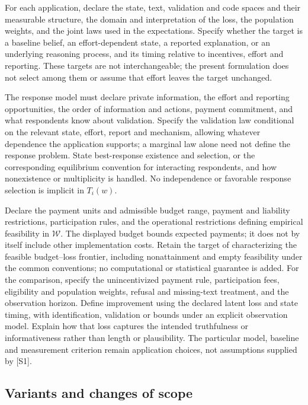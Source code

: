 \documentclass[11pt,a4paper]{article}
\begin{document}
For each application, declare the state, text, validation and code spaces and their measurable structure, the domain and interpretation of the loss, the population weights, and the joint laws used in the expectations. Specify whether the target is a baseline belief, an effort-dependent state, a reported explanation, or an underlying reasoning process, and its timing relative to incentives, effort and reporting. These targets are not interchangeable; the present formulation does not select among them or assume that effort leaves the target unchanged.

The response model must declare private information, the effort and reporting opportunities, the order of information and actions, payment commitment, and what respondents know about validation. Specify the validation law conditional on the relevant state, effort, report and mechanism, allowing whatever dependence the application supports; a marginal law alone need not define the response problem. State best-response existence and selection, or the corresponding equilibrium convention for interacting respondents, and how nonexistence or multiplicity is handled. No independence or favorable response selection is implicit in \(T_i(w)\).

Declare the payment units and admissible budget range, payment and liability restrictions, participation rules, and the operational restrictions defining empirical feasibility in \(\mathcal W\). The displayed budget bounds expected payments; it does not by itself include other implementation costs. Retain the target of characterizing the feasible budget--loss frontier, including nonattainment and empty feasibility under the common conventions; no computational or statistical guarantee is added. For the comparison, specify the unincentivized payment rule, participation fees, eligibility and population weights, refusal and missing-text treatment, and the observation horizon. Define improvement using the declared latent loss and state timing, with identification, validation or bounds under an explicit observation model. Explain how that loss captures the intended truthfulness or informativeness rather than length or plausibility. The particular model, baseline and measurement criterion remain application choices, not assumptions supplied by [S1].

\subsection*{Variants and changes of scope}
\end{document}
